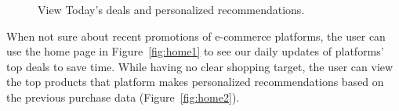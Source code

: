 \begin{figure}[t!]
	\caption{View Today's deals and personalized recommendations.}\vspace{-3ex}
	\label{fig:home}
\end{figure}
When not sure about recent promotions of e-commerce platforms, the user can use the home page in Figure~\ref{fig:home1} to see our daily updates of platforms' top deals to save time. While having no clear shopping target, the user can view the top products that platform makes personalized recommendations based on the previous purchase data (Figure~\ref{fig:home2}).

